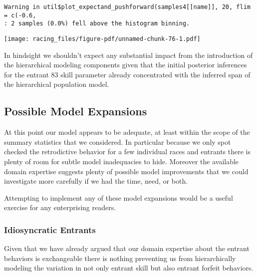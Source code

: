 \documentclass[
  letterpaper,
  DIV=11,
  numbers=noendperiod]{scrartcl}
\newenvironment{Shaded}{\begin{snugshade}}{\end{snugshade}}
\newcommand{\AttributeTok}[1]{\textcolor[rgb]{0.40,0.45,0.13}{#1}}
\newcommand{\DecValTok}[1]{\textcolor[rgb]{0.68,0.00,0.00}{#1}}
\newcommand{\FloatTok}[1]{\textcolor[rgb]{0.68,0.00,0.00}{#1}}
\newcommand{\FunctionTok}[1]{\textcolor[rgb]{0.28,0.35,0.67}{#1}}
\newcommand{\NormalTok}[1]{\textcolor[rgb]{0.00,0.23,0.31}{#1}}
\newcommand{\SpecialCharTok}[1]{\textcolor[rgb]{0.37,0.37,0.37}{#1}}
\newcommand{\StringTok}[1]{\textcolor[rgb]{0.13,0.47,0.30}{#1}}
\begin{document}
\begin{verbatim}
Warning in util$plot_expectand_pushforward(samples4[[name]], 20, flim = c(-0.6,
: 2 samples (0.0%) fell above the histogram binning.
\end{verbatim}

\begin{Shaded}
\end{Shaded}

\texttt{[image: racing\_files/figure-pdf/unnamed-chunk-76-1.pdf]}

In hindsight we shouldn't expect any substantial impact from the
introduction of the hierarchical modeling components given that the
initial posterior inferences for the entrant 83 skill parameter already
concentrated with the inferred span of the hierarchical population
model.

\subsection{Possible Model Expansions}\label{possible-model-expansions}

At this point our model appears to be adequate, at least within the
scope of the summary statistics that we considered. In particular
because we only spot checked the retrodictive behavior for a few
individual races and entrants there is plenty of room for subtle model
inadequacies to hide. Moreover the available domain expertise suggests
plenty of possible model improvements that we could investigate more
carefully if we had the time, need, or both.

Attempting to implement any of these model expansions would be a useful
exercise for any enterprising readers.

\subsubsection{Idiosyncratic Entrants}\label{idiosyncratic-entrants}

Given that we have already argued that our domain expertise about the
entrant behaviors is exchangeable there is nothing preventing us from
hierarchically modeling the variation in not only entrant skill but also
entrant forfeit behaviors.
\end{document}
